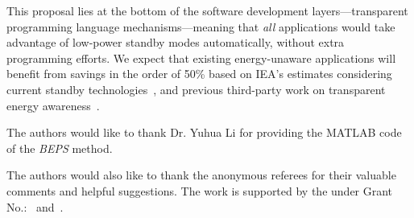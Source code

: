 
This proposal lies at the bottom of the software development
layers---transparent programming language mechanisms---meaning that \emph{all}
applications would take advantage of low-power standby modes automatically,
without extra programming efforts.
%
We expect that existing energy-unaware applications will benefit from savings
in the order of 50\% based on IEA's estimates considering current standby
technologies~\cite{iea.data}, and previous third-party work on transparent energy
awareness~\cite{wsn.tos.2}.

\begin{acks}
  The authors would like to thank Dr. Yuhua Li for providing the
  MATLAB code of the \textit{BEPS} method.

  The authors would also like to thank the anonymous referees for
  their valuable comments and helpful suggestions. The work is
  supported by the  under Grant
  No.:~
  and~.

\end{acks}
